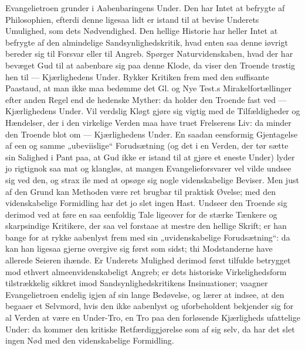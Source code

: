 \documentclass[12pt,a4paper]{book}
\begin{document}
Evangelietroen grunder i Aabenbaringens Under. Den har Intet at befrygte af
Philosophien, efterdi denne ligesaa lidt er istand til at bevise Underets
Umulighed, som dets Nødvendighed. Den hellige Historie har heller Intet at
befrygte af den almindelige Sandsynlighedskritik, hvad enten saa denne iøvrigt
bereder sig til Forsvar eller til Angreb. Spørger Naturvidenskaben, hvad der har
bevæget Gud til at aabenbare sig paa denne Klode, da viser den Troende trøstig
hen til --- Kjærlighedens Under. Rykker Kritiken frem med den suffisante
Paastaud, at man ikke maa bedømme det Gl. og Nye Test.s Mirakelfortællinger
efter anden Regel end de hedenske Myther: da holder den Troende fast ved ---
Kjærlighedens Under. Vil verdslig Kløgt gjøre sig vigtig med de Tilfældigheder
og Hændelser, der i den virkelige Verden maa have truet Frelserens Liv: da
minder den Troende blot om --- Kjærlighedens Under. En saadan eensformig
Gjentagelse
af een og samme „ubeviislige“ Forudsætning (og det i en Verden, der tør sætte
sin Salighed i Pant paa, at Gud ikke er istand til at gjøre et eneste Under)
lyder jo rigtignok saa mat og klangløs, at mangen Evangelieforsvarer vel vilde
undsee sig ved den, og
strax ile med at opsøge sig nogle videnskabelige Beviser. Men just af den Grund
kan Methoden være ret brugbar til praktisk Øvelse; med den videnskabelige
Formidling har det jo slet ingen Hast. Undseer den Troende sig derimod ved at
føre en saa eenfoldig Tale ligeover for de stærke Tænkere og skarpsindige
Kritikere, der saa vel forstaae at mestre den hellige Skrift; er han bange for
at rykke aabenlyst frem med sin „uvidenskabelige Forudsætning“: da kan han
ligesaa gjerne overgive sig først som sidst; thi Modstanderne have allerede
Seieren ihænde. Er Underets Mulighed derimod først tilfulde betrygget mod
ethvert almeenvidenskabeligt Angreb; er dets historiske Virkelighedsform
tilstrækkelig sikkret imod Sandsynlighedskritikens Insinuationer; vaagner
Evangelietroen endelig igjen af sin lange Bedøvelse, og lærer at indsee, at den
begaaer et Selvmord, hvis den ikke aabenlyst og uforbeholdent bekjender sig for
al Verden at være en Under-Tro, en Tro paa den forløsende Kjærligheds ufattelige
Under: da kommer den kritiske Retfærdiggjørelse som af sig selv, da har det slet
ingen Nød med den videnskabelige Formidling.
\end{document}

